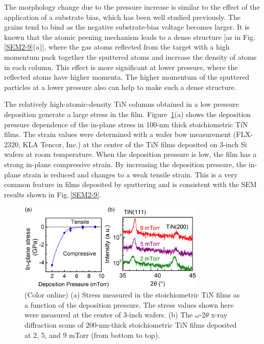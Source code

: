 The morphology change due to the pressure increase is similar to the effect of the application of a substrate bias, which has been well studied previously.\cite{Kumar1988} The grains tend to bind as the negative substrate-bias voltage becomes larger. It is known that the atomic peening mechanism leads to a dense structure [as in Fig.\,\ref{SEM2-9}(a)], where the gas atoms reflected from the target with a high momentum pack together the sputtered atoms and increase the density of atoms in each column.\cite{Thornton1985} This effect is more significant at lower pressure, where the reflected atoms have higher momenta. The higher momentum of the sputtered particles at a lower pressure also can help to make such a dense structure.

The relatively high-atomic-density TiN columns obtained in a low pressure deposition generate a large stress in the film. Figure \,\ref{Stress-XRD}(a) shows the deposition pressure dependence of the in-plane stress in 100-nm thick stoichiometric TiN films. The strain values were determined with a wafer bow measurement (FLX-2320, KLA Tencor, Inc.) at the center of the TiN films deposited on 3-inch Si wafers  at room temperature. When the deposition pressure is low, the film has a strong in-plane compressive strain. By increasing the deposition pressure, the in-plane strain is reduced and changes to a weak tensile strain. This is a very common feature in films deposited by sputtering and is consistent with the SEM results shown in Fig.\,\ref{SEM2-9}.

\begin{figure}
\begin{center}
\includegraphics[width=89mm]{Stress-XRD.jpg}
\end{center}
\caption{(Color online) (a) Stress measured in the stoichiometric TiN films as a function of the deposition pressure. The stress values shown here were measured at the center of 3-inch wafers. (b) The $\omega$-2$\theta$ x-ray diffraction scans of 200-nm-thick stoichiometric TiN films deposited at 2, 5, and 9 mTorr (from bottom to top).}
\label{Stress-XRD}
\end{figure}

